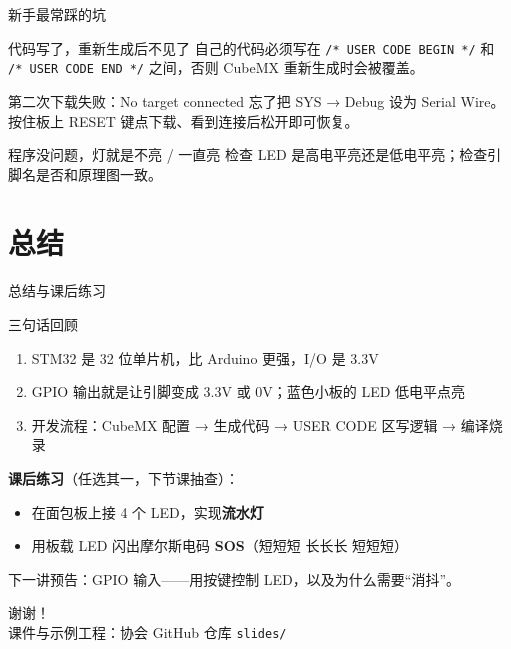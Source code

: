 \documentclass[aspectratio=169,11pt]{ctexbeamer}
\begin{document}
\begin{frame}{新手最常踩的坑}
  \begin{alertblock}{代码写了，重新生成后不见了}
    自己的代码必须写在 \texttt{/* USER CODE BEGIN */} 和 \texttt{/* USER CODE END */} 之间，否则 CubeMX 重新生成时会被覆盖。
  \end{alertblock}
  \begin{alertblock}{第二次下载失败：No target connected}
    忘了把 SYS → Debug 设为 Serial Wire。按住板上 RESET 键点下载、看到连接后松开即可恢复。
  \end{alertblock}
  \begin{alertblock}{程序没问题，灯就是不亮 / 一直亮}
    检查 LED 是高电平亮还是低电平亮；检查引脚名是否和原理图一致。
  \end{alertblock}
\end{frame}

\section{总结}

\begin{frame}{总结与课后练习}
  \begin{block}{三句话回顾}
    \begin{enumerate}
      \item STM32 是 32 位单片机，比 Arduino 更强，I/O 是 3.3V
      \item GPIO 输出就是让引脚变成 3.3V 或 0V；蓝色小板的 LED 低电平点亮
      \item 开发流程：CubeMX 配置 → 生成代码 → USER CODE 区写逻辑 → 编译烧录
    \end{enumerate}
  \end{block}
  \textbf{课后练习}（任选其一，下节课抽查）：
  \begin{itemize}
    \item 在面包板上接 4 个 LED，实现\textbf{流水灯}
    \item 用板载 LED 闪出摩尔斯电码 \textbf{SOS}（短短短 长长长 短短短）
  \end{itemize}
  \small 下一讲预告：GPIO 输入——用按键控制 LED，以及为什么需要“消抖”。
\end{frame}

\begin{frame}
  \centering\Huge 谢谢！\\[1em]
  \normalsize 课件与示例工程：协会 GitHub 仓库 \texttt{slides/}
\end{frame}
\end{document}

